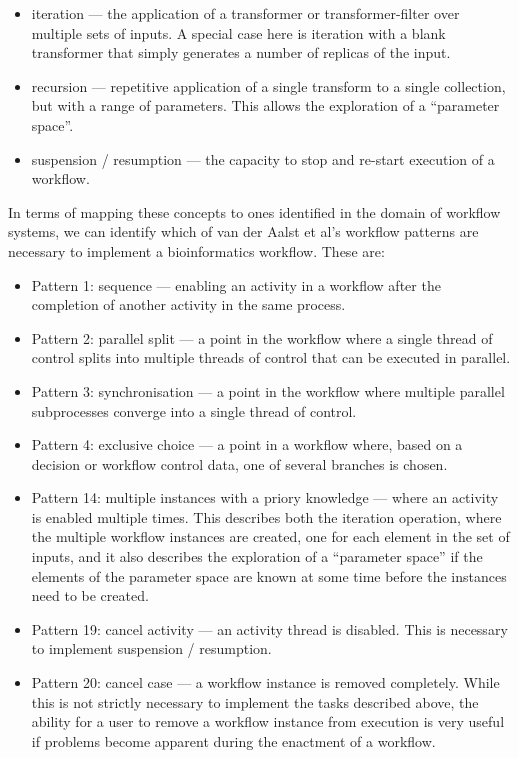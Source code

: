 \documentclass[a4paper,10pt]{scrreprt}
\begin{document}
\begin{itemize}

\item iteration --- the application of a transformer or transformer-filter over multiple sets of inputs. A special case here is iteration with a blank transformer that simply generates a number of replicas of the input.

\item recursion --- repetitive application of a single transform to a single collection, but with a range of parameters. This allows the exploration of a ``parameter space''.

\item suspension / resumption --- the capacity to stop and re-start execution of a workflow.

\end{itemize}

In terms of mapping these concepts to ones identified in the domain of workflow systems, we can identify which of van der Aalst et al's \cite{van_der_aalst_workflow_2003} workflow patterns are necessary to implement a bioinformatics workflow. These are:

\begin{itemize}
\item Pattern 1: sequence --- enabling an activity in a workflow after the completion of another activity in the same process.
\item Pattern 2: parallel split --- a point in the workflow where a single thread of control splits into multiple threads of control that can be executed in parallel.
\item Pattern 3: synchronisation ---  a point in the workflow where multiple parallel subprocesses converge into a single thread of control.
\item Pattern 4: exclusive choice --- a point in a workflow where, based on a decision or workflow control data, one of several branches is chosen.
\item Pattern 14: multiple instances with a priory knowledge --- where an activity is enabled multiple times. This describes both the iteration operation, where the multiple workflow instances are created, one for each element in the set of inputs, and it also describes the exploration of a ``parameter space'' if the elements of the parameter space are known at some time before the instances need to be created.
\item Pattern 19: cancel activity --- an activity thread is disabled. This is necessary to implement suspension / resumption.
\item Pattern 20: cancel case --- a workflow instance is removed completely. While this is not strictly necessary to implement the tasks described above, the ability for a user to remove a workflow instance from execution is very useful if problems become apparent during the enactment of a workflow.
\end{itemize}
\end{document}
